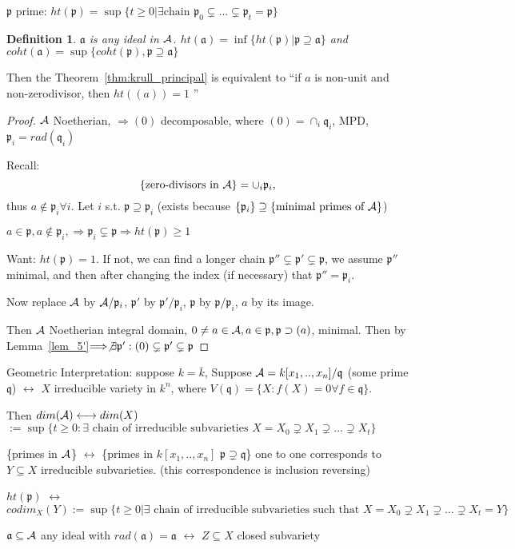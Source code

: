 \documentclass[11pt]{article}
\newtheorem{dfn}[thm]{Definition}
\newcommand{\sca}{{\mathfrak a}}
\newcommand{\scp}{{\mathfrak p}}
\newcommand{\scq}{\mathfrak q}
\newcommand{\cala}{{\cal A}}
\newcommand{\Lrta}{\Longrightarrow}
\newcommand{\llrta}{\longleftrightarrow}
\begin{document}
$\scp$ prime: $ht(\scp)=\sup\{t\geq 0|\exists \text{chain } \scp_0\subsetneq...\subsetneq \scp_t=\scp\}$
\begin{dfn}$\sca$ is any ideal in $\cala$.
$ht(\sca)=\inf\{ht(\scp)|\scp\supseteq\sca\}$
 and $coht(\sca)=\sup\{coht(\scp),\scp\supseteq \sca\}$
\end{dfn}

Then the Theorem~\ref{thm:krull_principal} is equivalent to 
``if $a$ is non-unit and non-zerodivisor, then $ht((a))=1$ ''
\begin{proof}
$\cala$ Noetherian, $\Lrta (0)$ decomposable, where $(0)=\cap_i\scq_i$, MPD, $\scp_i=rad(\scq_i)$

Recall:
$$
\{\text{zero-divisors in }\cala\} =\cup_i\scp_i,
$$
thus $a\notin\scp_i\forall i$. Let $i$ s.t. $\scp\supseteq \scp_i$ (exists because $\{\scp_i\}\supseteq \{\text{minimal primes of $\cala$}\}$)

$a\in\scp ,a\notin \scp_i,\Lrta\scp_i\subsetneq \scp\Lrta ht(\scp)\geq 1$

Want: $ht(\scp)=1$. If not, we can find a longer chain $\scp''\subsetneq \scp'\subsetneq \scp$, we assume $\scp''$ minimal, and then after changing the index (if necessary) that $\scp''=\scp_i$.

Now replace
$\cala$ by $\cala/\scp_i$, $\scp'$ by $\scp'/\scp_i$, $\scp$ by $\scp/\scp_i$, $a$ by its image.

Then $\cala$ Noetherian integral domain, $0\neq a\in \cala,a\in\scp,\scp\supset(a)$, minimal.
Then by Lemma~\ref{lem_5'}$\Lrta \not \exists \scp':(0)\subsetneq \scp'\subsetneq \scp$
\end{proof}

Geometric Interpretation: suppose $k=\overline{k}$,
Suppose $\cala=k[x_1,..,x_n]/\scq$ (some prime $\scq$) $\llrta$ $X$ irreducible variety in $k^n$, where $V(\scq)=\{X:f(X)=0\forall f\in\scq\}$.

Then $dim(\cala)\llrta dim(X)$ $:=\sup\{t\geq 0:\exists\text{ chain of irreducible subvarieties } X=X_0\supsetneq X_1\supsetneq ...\supsetneq X_t\}$

\{primes in $\cala$\} $\llrta$ \{primes in $k[x_1,..,x_n]$ $\scp\supsetneq \scq$\} one to one corresponds to $Y\subseteq X$ irreducible subvarieties. (this correspondence is inclusion reversing)

$ht(\scp)$ $\llrta$ $codim_X(Y):=\sup\{t\geq 0|\exists \text{ chain of irreducible subvarieties such that }X=X_0\supsetneq X_1\supsetneq ...\supsetneq X_t=Y\}$

$\sca\subseteq\cala$ any ideal with $rad(\sca)=\sca $ $\llrta$ $Z\subseteq X$ closed subvariety
\end{document}
